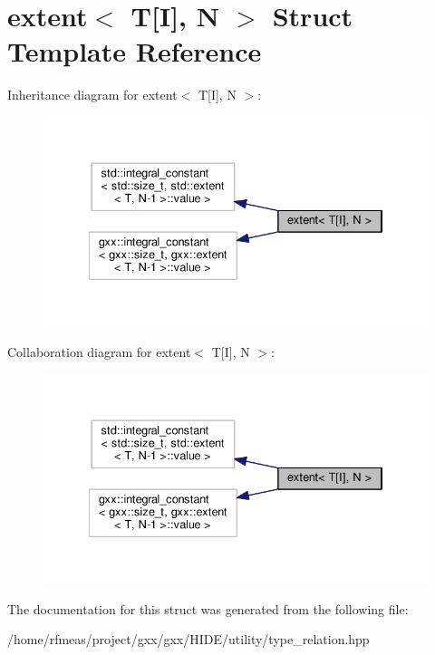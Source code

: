 \hypertarget{structextent_3_01T[I]_00_01N_01_4}{}\section{extent$<$ T\mbox{[}I\mbox{]}, N $>$ Struct Template Reference}
\label{structextent_3_01T[I]_00_01N_01_4}


Inheritance diagram for extent$<$ T\mbox{[}I\mbox{]}, N $>$\+:
\nopagebreak
\begin{figure}[H]
\begin{center}
\leavevmode
\includegraphics[width=334pt]{structextent_3_01T[I]_00_01N_01_4__inherit__graph}
\end{center}
\end{figure}


Collaboration diagram for extent$<$ T\mbox{[}I\mbox{]}, N $>$\+:
\nopagebreak
\begin{figure}[H]
\begin{center}
\leavevmode
\includegraphics[width=334pt]{structextent_3_01T[I]_00_01N_01_4__coll__graph}
\end{center}
\end{figure}


The documentation for this struct was generated from the following file\+:\begin{DoxyCompactItemize}
\item 
/home/rfmeas/project/gxx/gxx/\+H\+I\+D\+E/utility/type\+\_\+relation.\+hpp\end{DoxyCompactItemize}
